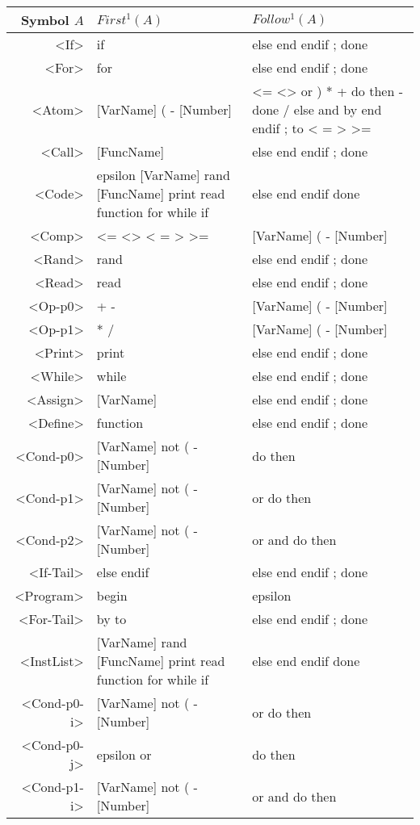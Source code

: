 \begin{longtable}{r p{7cm} p{7cm}}
\textnormal{Symbol} $A$ & $First^1(A)$ & $Follow^1(A)$\\ \hline
<If> & if  & else end endif ; done \\ \hline
<For> & for  & else end endif ; done \\ \hline
<Atom> & [VarName] ( - [Number]  & <= <> or ) * + do then - done / else and by end endif ; to < = > >= \\ \hline
<Call> & [FuncName]  & else end endif ; done \\ \hline
<Code> & epsilon [VarName] rand [FuncName] print read function for while if  & else end endif done \\ \hline
<Comp> & <= <> < = > >=  & [VarName] ( - [Number] \\ \hline
<Rand> & rand  & else end endif ; done \\ \hline
<Read> & read  & else end endif ; done \\ \hline
<Op-p0> & + -  & [VarName] ( - [Number] \\ \hline
<Op-p1> & * /  & [VarName] ( - [Number] \\ \hline
<Print> & print  & else end endif ; done \\ \hline
<While> & while  & else end endif ; done \\ \hline
<Assign> & [VarName]  & else end endif ; done \\ \hline
<Define> & function  & else end endif ; done \\ \hline
<Cond-p0> & [VarName] not ( - [Number]  & do then \\ \hline
<Cond-p1> & [VarName] not ( - [Number]  & or do then \\ \hline
<Cond-p2> & [VarName] not ( - [Number]  & or and do then \\ \hline
<If-Tail> & else endif  & else end endif ; done \\ \hline
<Program> & begin  & epsilon \\ \hline
<For-Tail> & by to  & else end endif ; done \\ \hline
<InstList> & [VarName] rand [FuncName] print read function for while if  & else end endif done \\ \hline
<Cond-p0-i> & [VarName] not ( - [Number]  & or do then \\ \hline
<Cond-p0-j> & epsilon or  & do then \\ \hline
<Cond-p1-i> & [VarName] not ( - [Number]  & or and do then \\ \hline

\end{longtable}

